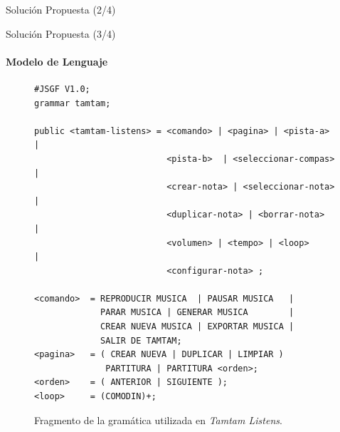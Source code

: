 \begin{frame}{Soluci\'on Propuesta (2/4)}

\end{frame}

\begin{frame}[fragile]{Soluci\'on Propuesta (3/4)}
\framesubtitle{Modelo de Lenguaje}
\begin{figure}[H]
\lstset{basicstyle=\ttfamily\scriptsize}
\begin{lstlisting}
#JSGF V1.0;
grammar tamtam;

public <tamtam-listens> = <comando> | <pagina> | <pista-a>  |
                          <pista-b>  | <seleccionar-compas> | 
                          <crear-nota> | <seleccionar-nota> | 
                          <duplicar-nota> | <borrar-nota>   | 
                          <volumen> | <tempo> | <loop>      |
                          <configurar-nota> ;

<comando>  = REPRODUCIR MUSICA  | PAUSAR MUSICA   |
             PARAR MUSICA | GENERAR MUSICA        | 
             CREAR NUEVA MUSICA | EXPORTAR MUSICA | 
             SALIR DE TAMTAM;
<pagina>   = ( CREAR NUEVA | DUPLICAR | LIMPIAR ) 
              PARTITURA | PARTITURA <orden>;
<orden>    = ( ANTERIOR | SIGUIENTE );
<loop>     = (COMODIN)+;
\end{lstlisting}
\caption{Fragmento de la gram\'atica utilizada en \emph{Tamtam Listens}.}
\label{figure:fragmento-gram}
\end{figure} 
\end{frame}

